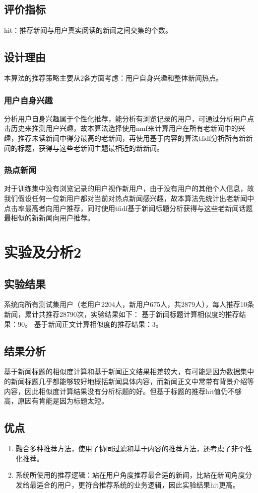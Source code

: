 \documentclass[UTF8]{article}
\begin{document}
\subsection{评价指标}
hit：推荐新闻与用户真实阅读的新闻之间交集的个数。
\subsection{设计理由}
本算法的推荐策略主要从2各方面考虑：用户自身兴趣和整体新闻热点。
\subsubsection{用户自身兴趣}
分析用户自身兴趣属于个性化推荐，能分析有浏览记录的用户，可通过分析用户点击历史来推测用户兴趣，故本算法选择使用nmf来计算用户在所有老新闻中的兴趣，推荐未读新闻中得分最高的老新闻，再使用基于内容的算法tfidf分析所有新新闻的标题，获得与这些老新闻主题最相近的新新闻。
\subsubsection{热点新闻}
对于训练集中没有浏览记录的用户视作新用户，由于没有用户的其他个人信息，故我们假设任何一位新用户都对当前对热点新闻感兴趣，故本算法先统计出老新闻中点击率最高者向用户推荐，同时使用tfidf基于新闻标题分析获得与这些老新闻话题最相似的新新闻向用户推荐。
\section{实验及分析2}
\subsection{实验结果}
系统向所有测试集用户（老用户2204人，新用户675人，共2879人），每人推荐10条新闻，累计共推荐28790次，实验结果如下：
基于新闻标题计算相似度的推荐结果：90。
基于新闻正文计算相似度的推荐结果：3。
\subsection{结果分析}
基于新闻标题的相似度计算和基于新闻正文结果相差较大，有可能是因为数据集中的新闻标题几乎都能够较好地概括新闻具体内容，而新闻正文中常带有背景介绍等内容，因此相似度计算结果没有分析标题的好。但基于标题的推荐hit值仍不够高，原因有肯能是因为标题太短。
\subsection{优点}
\begin{enumerate}
	\item 融合多种推荐方法，使用了协同过滤和基于内容的推荐方法，还考虑了非个性化推荐。
	\item 系统所使用的推荐逻辑：站在用户角度推荐最合适的新闻，比站在新闻角度分发给最适合的用户，更符合推荐系统的业务逻辑，因此实验结果hit更高。
\end{enumerate}
\end{document}
